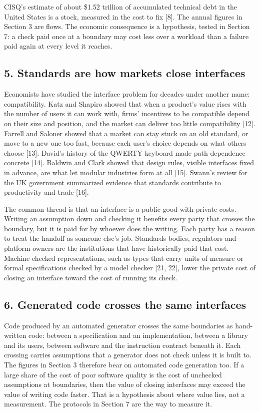 \documentclass[
  10pt,
]{article}
\begin{document}
CISQ's estimate of about \$1.52 trillion of accumulated technical debt
in the United States is a stock, measured in the cost to fix {[}8{]}.
The annual figures in Section 3 are flows. The economic consequence is a
hypothesis, tested in Section 7: a check paid once at a boundary may
cost less over a workload than a failure paid again at every level it
reaches.

\subsection{5. Standards are how markets close
interfaces}\label{standards-are-how-markets-close-interfaces}

Economists have studied the interface problem for decades under another
name: compatibility. Katz and Shapiro showed that when a product's value
rises with the number of users it can work with, firms' incentives to be
compatible depend on their size and position, and the market can deliver
too little compatibility {[}12{]}. Farrell and Saloner showed that a
market can stay stuck on an old standard, or move to a new one too fast,
because each user's choice depends on what others choose {[}13{]}.
David's history of the QWERTY keyboard made path dependence concrete
{[}14{]}. Baldwin and Clark showed that design rules, visible interfaces
fixed in advance, are what let modular industries form at all {[}15{]}.
Swann's review for the UK government summarized evidence that standards
contribute to productivity and trade {[}16{]}.

The common thread is that an interface is a public good with private
costs. Writing an assumption down and checking it benefits every party
that crosses the boundary, but it is paid for by whoever does the
writing. Each party has a reason to treat the handoff as someone else's
job. Standards bodies, regulators and platform owners are the
institutions that have historically paid that cost. Machine-checked
representations, such as types that carry units of measure or formal
specifications checked by a model checker {[}21, 22{]}, lower the
private cost of closing an interface toward the cost of running its
check.

\subsection{6. Generated code crosses the same
interfaces}\label{generated-code-crosses-the-same-interfaces}

Code produced by an automated generator crosses the same boundaries as
hand-written code: between a specification and an implementation,
between a library and its users, between software and the instruction
contract beneath it. Each crossing carries assumptions that a generator
does not check unless it is built to. The figures in Section 3 therefore
bear on automated code generation too. If a large share of the cost of
poor software quality is the cost of unchecked assumptions at
boundaries, then the value of closing interfaces may exceed the value of
writing code faster. That is a hypothesis about where value lies, not a
measurement. The protocols in Section 7 are the way to measure it.
\end{document}
